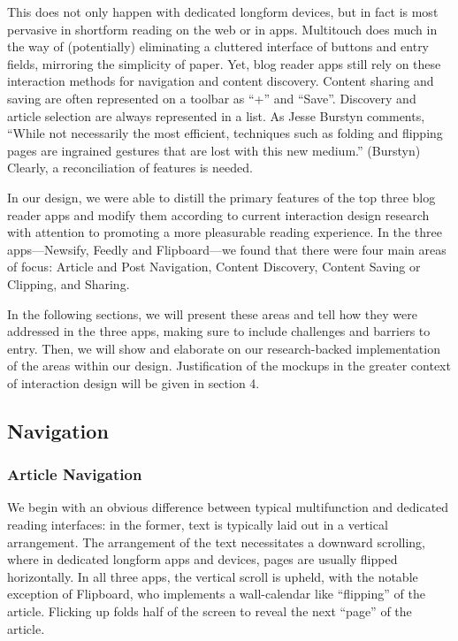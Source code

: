 \documentclass[11pt, oneside]{article}   	%
\begin{document}
This does not only happen with dedicated longform devices, but in fact is most pervasive in shortform reading on the web or in apps. Multitouch does much in the way of (potentially) eliminating a cluttered interface of buttons and entry fields, mirroring the simplicity of paper. Yet, blog reader apps still rely on these interaction methods for navigation and content discovery. Content sharing and saving are often represented on a toolbar as ``+'' and ``Save''. Discovery and article selection are always represented in a list. As Jesse Burstyn comments, ``While not necessarily the most efficient, techniques such as folding and flipping pages are ingrained gestures that are lost with this new medium.'' (Burstyn) Clearly, a reconciliation of features is needed.

In our design, we were able to distill the primary features of the top three blog reader apps and modify them according to current interaction design research with attention to promoting a more pleasurable reading experience. In the three apps---Newsify, Feedly and Flipboard---we found that there were four main areas of focus: Article and Post Navigation, Content Discovery, Content Saving or Clipping, and Sharing. 

In the following sections, we will present these areas and tell how they were addressed in the three apps, making sure to include challenges and barriers to entry. Then, we will show and elaborate on our research-backed implementation of the areas within our design. Justification of the mockups in the greater context of interaction design will be given in section 4.

\subsection{Navigation}

\subsubsection{Article Navigation}
We begin with an obvious difference between typical multifunction and dedicated reading interfaces: in the former, text is typically laid out in a vertical arrangement. The arrangement of the text necessitates a downward scrolling, where in dedicated longform apps and devices, pages are usually flipped horizontally. In all three apps, the vertical scroll is upheld, with the notable exception of Flipboard, who implements a wall-calendar like ``flipping'' of the article. Flicking up folds half of the screen to reveal the next ``page'' of the article. 
\end{document}
